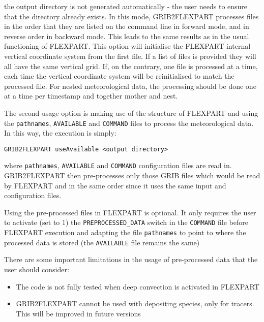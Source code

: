 \documentclass{egu}                  %
\begin{document}
the output directory is not generated automatically - the user needs to ensure that the directory already exists. In this mode, GRIB2FLEXPART processes files in the order that they are listed on the command line in forward mode, and in reverse order in backward mode. This leads to the same results as in the usual functioning of FLEXPART.  This option will initialise the FLEXPART internal vertical coordinate system from the first file. If a list of files is provided they will all have the same vertical grid. If, on the contrary, one file is processed at a time, each time the vertical coordinate system will be reinitialised to match the processed file. For nested meteorological data, the processing should be done one at a time per timestamp and together mother and nest. 

The second usage option is making use of the structure of FLEXPART and using the \verb|pathnames|, \verb|AVAILABLE| and \verb|COMMAND| files to process the meteorological data. In this way, the execution is simply:


\begin{small}
\begin{verbatim}
GRIB2FLEXPART useAvailable <output directory> 
\end{verbatim}
\end{small}

where \verb|pathnames|, \verb|AVAILABLE| and \verb|COMMAND| configuration files are read in. GRIB2FLEXPART then pre-processes only those GRIB files which would be read by FLEXPART and in the same order since it uses the same input and configuration files.


Using the pre-processed files in FLEXPART is optional. It only requires the user to activate (set to 1) the \verb|PREPROCESSED_DATA| switch in the \verb|COMMAND| file before FLEXPART execution and adapting the file \verb|pathnames| to point to where the processed data is stored (the \verb|AVAILABLE| file remains the same)


There are some important limitations in the usage of pre-processed data that the user should consider:

\begin{itemize}
\item The code is not fully tested when deep convection is activated in FLEXPART
\item GRIB2FLEXPART cannot be used with depositing species, only for tracers. This will be improved in future versions
\end{itemize}
\end{document}
